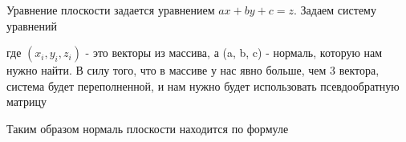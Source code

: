 Уравнение плоскости задается уравнением $ax+by+c=z$. 
Задаем систему уравнений 
\begin{figure}[H]
\end{figure}
где $(x_i, y_i, z_i)$  - это векторы из массива, а (a, b, c) - нормаль, которую нам нужно найти. В силу того, что в массиве у нас явно больше, чем 3 вектора, система будет переполненной, и нам нужно будет использовать псевдообратную матрицу 
\begin{figure}[H]
\end{figure}
Таким образом нормаль плоскости находится по формуле
\begin{figure}[H]
\end{figure}
\begin{figure}[H]
\end{figure}
